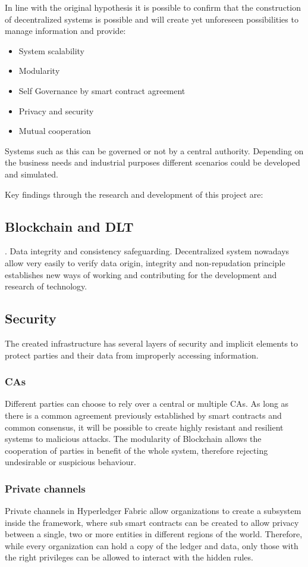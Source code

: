 \documentclass[a4paper]{article}
\begin{document}
In line with the original hypothesis it is possible to confirm that the construction of decentralized systems is possible and will create yet unforeseen possibilities to manage information and provide:
\begin{itemize}
    \item System scalability
    \item Modularity
    \item Self Governance by smart contract agreement
    \item Privacy and security
    \item Mutual cooperation
\end{itemize}

Systems such as this can be governed or not by a central authority. Depending on the business needs and industrial purposes different scenarios could be developed and simulated.

Key findings through the research and development of this project are:
\subsection{Blockchain and DLT}.
Data integrity and consistency safeguarding. Decentralized system nowadays allow very easily to verify data origin, integrity and non-repudation principle  establishes new ways of working and contributing for the development and research of technology.

\subsection{Security}
The created infrastructure has several layers of security and implicit elements to protect parties and their data from improperly accessing information. 
\subsubsection{CAs}
Different parties can choose to rely over a central or multiple CAs. As long as there is a common agreement previously established by smart contracts and common consensus, it will be possible to create highly resistant and resilient systems to malicious attacks. The modularity of Blockchain allows the cooperation of parties in benefit of the whole system, therefore rejecting undesirable or suspicious behaviour.

\subsubsection{Private channels}
Private channels in Hyperledger Fabric allow organizations to create a subsystem inside the framework, where sub smart contracts can be created to allow privacy between a single, two or more entities in different regions of the world.
Therefore, while every organization can hold a copy of the ledger and data, only those with the right privileges can be allowed to interact with the hidden rules.
\end{document}
